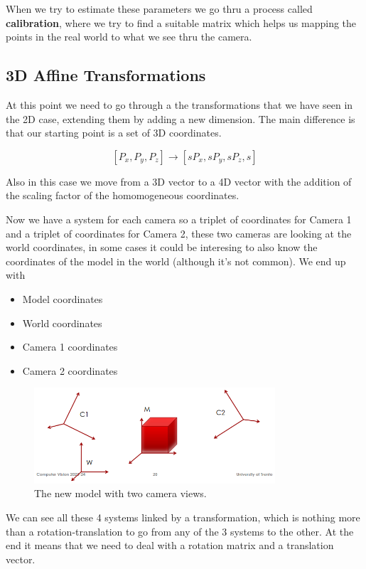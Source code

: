 When we try to estimate these parameters we go thru a process called \textbf{calibration}, where we try to find a suitable matrix which helps us mapping the points in the real world to what we see thru the camera.

\subsection{3D Affine Transformations}

At this point we need to go through a the transformations that we have seen in the 2D case, extending them by adding a new dimension. The main difference is that our starting point is a set of 3D coordinates.

\[ [P_x, P_y, P_z] \rightarrow  [sP_x, sP_y, sP_z, s] \]

Also in this case we move from a 3D vector to a 4D vector with the addition of the scaling factor of the homomogeneous coordinates.

Now we have a system for each camera so a triplet of coordinates for Camera 1 and a triplet of coordinates for Camera 2, these two cameras are looking at the world coordinates, in some cases it could be interesing to also know the coordinates of the model in the world (although it's not common). We end up with

\begin{itemize} 
    \item Model coordinates
    \item World coordinates
    \item Camera 1 coordinates
    \item Camera 2 coordinates
\end{itemize}

\begin{figure}[H]
    \centering
    \includegraphics[width=0.8\textwidth]{Figures/coo.png}
    \caption{The new model with two camera views.}
    \label{fig:coo}
\end{figure}

We can see all these 4 systems linked by a transformation, which is nothing more than a rotation-translation to go from any of the 3 systems to the other. At the end it means that we need to deal with a rotation matrix and a translation vector.


